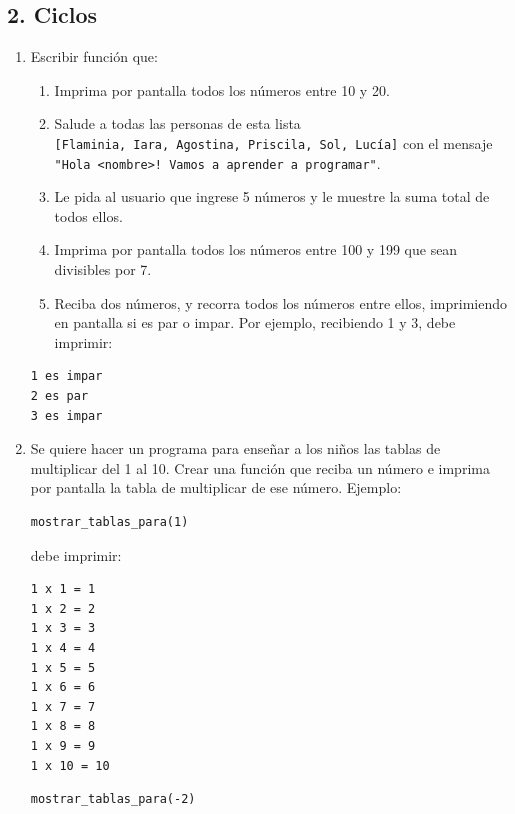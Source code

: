 \documentclass[
  letterpaper,
  DIV=11,
  numbers=noendperiod]{scrreprt}
\providecommand{\tightlist}{%
  \setlength{\itemsep}{0pt}\setlength{\parskip}{0pt}}\usepackage{longtable,booktabs,array}
\begin{document}
\hypertarget{ciclos-1}{%
\subsection*{2. Ciclos}\label{ciclos-1}}

\begin{enumerate}
\def\labelenumi{\arabic{enumi}.}
\item
  Escribir función que:

  \begin{enumerate}
  \def\labelenumii{\alph{enumii}.}
  \tightlist
  \item
    Imprima por pantalla todos los números entre 10 y 20.
  \item
    Salude a todas las personas de esta lista
    \texttt{{[}Flaminia,\ Iara,\ Agostina,\ Priscila,\ Sol,\ Lucía{]}}
    con el mensaje
    \texttt{"Hola\ \textless{}nombre\textgreater{}!\ Vamos\ a\ aprender\ a\ programar"}.
  \item
    Le pida al usuario que ingrese 5 números y le muestre la suma total
    de todos ellos.
  \item
    Imprima por pantalla todos los números entre 100 y 199 que sean
    divisibles por 7.
  \item
    Reciba dos números, y recorra todos los números entre ellos,
    imprimiendo en pantalla si es par o impar. Por ejemplo, recibiendo 1
    y 3, debe imprimir:
  \end{enumerate}

\begin{verbatim}
1 es impar
2 es par
3 es impar
\end{verbatim}
\item
  Se quiere hacer un programa para enseñar a los niños las tablas de
  multiplicar del 1 al 10. Crear una función que reciba un número e
  imprima por pantalla la tabla de multiplicar de ese número. Ejemplo:

\begin{verbatim}
mostrar_tablas_para(1)
\end{verbatim}

  debe imprimir:

\begin{verbatim}
1 x 1 = 1
1 x 2 = 2
1 x 3 = 3
1 x 4 = 4
1 x 5 = 5
1 x 6 = 6
1 x 7 = 7
1 x 8 = 8
1 x 9 = 9
1 x 10 = 10
\end{verbatim}

\begin{verbatim}
mostrar_tablas_para(-2)
\end{verbatim}


\end{enumerate}
\end{document}
